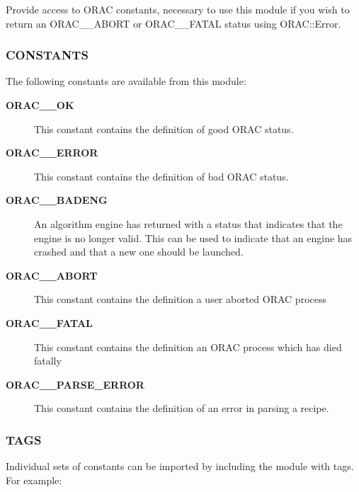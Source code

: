 Provide access to ORAC constants, necessary to use this module if you wish
to return an ORAC\_\_ABORT or ORAC\_\_FATAL status using ORAC::Error.

\subsubsection*{CONSTANTS\label{ORAC::Constants_CONSTANTS}}


The following constants are available from this module:

\begin{description}

\item[\textbf{ORAC\_\_OK}] \mbox{}

This constant contains the definition of good ORAC status.


\item[\textbf{ORAC\_\_ERROR}] \mbox{}

This constant contains the definition of bad ORAC status.


\item[\textbf{ORAC\_\_BADENG}] \mbox{}

An algorithm engine has returned with a status that indicates
that the engine is no longer valid. This can be used to
indicate that an engine has crashed and that a new one should be
launched.


\item[\textbf{ORAC\_\_ABORT}] \mbox{}

This constant contains the definition a user aborted ORAC process


\item[\textbf{ORAC\_\_FATAL}] \mbox{}

This constant contains the definition an ORAC process which has died fatally


\item[\textbf{ORAC\_\_PARSE\_ERROR}] \mbox{}

This constant contains the definition of an error in parsing a recipe.

\end{description}
\subsubsection*{TAGS\label{ORAC::Constants_TAGS}}


Individual sets of constants can be imported by 
including the module with tags. For example:

